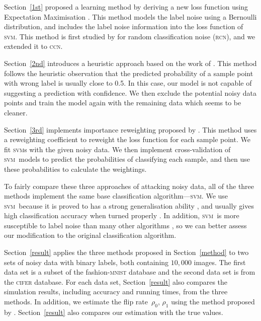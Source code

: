 \documentclass[12pt]{article} %
\newcommand{\svm}{\textsc{svm}}
\begin{document}
Section~\ref{1st} proposed a learning method by deriving a new loss function using Expectation Maximisation \citep[p.423]{Bishop:2006:PRM:1162264}. This method models the label noise using a Bernoulli distribution, and includes the label noise information into the loss function of \svm. This method is first studied by \citet{pmlr-v20-biggio11} for random classification noise (\textsc{rcn}), and we extended it to \textsc{ccn}. 

Section~\ref{2nd} introduces a heuristic approach based on the work of \citet{brodley1996identifying}. This method follows the heuristic observation that the predicted probability of a sample point with wrong label is usually close to 0.5. In this case, our model is not capable of suggesting a prediction with confidence. We then exclude the potential noisy data points and train the model again with the remaining data which seems to be cleaner. 

Section~\ref{3rd} implements importance reweighting proposed by \citet{liu2016classification}. This method uses a reweighting coefficient to reweight the loss function for each sample point. We fit \svm s with the given noisy data. We then implement cross-validation of \svm\ models to predict the probabilities of classifying each sample, and then use these probabilities to calculate the weightings.

To fairly compare these three approaches of attacking noisy data, all of the three methods implement the same base classification algorithm---\svm. We use \svm\ because it is proved to has a strong generalisation ability \citep{NIPS2012_4500,Seeger:2003:PGE:944919.944929,Cortes1995}, and usually gives high classification accuracy when turned properly \citep{Fernandez-Delgado:2014:WNH:2627435.2697065}. In addition, \svm\ is more susceptible to label noise than many other algorithms \citep{frenay2014classification}, so we can better assess our modification to the original classification algorithm.

Section~\ref{result} applies the three methods proposed in Section~\ref{method} to two sets of noisy data with binary labels, both containing $10,000$ images. The first data set is a subset of the fashion-\textsc{mnist} database and the second data set is from the \textsc{cifer} database. For each data set, Section~\ref{result} also compares the simulation results, including accuracy and running times, from the three methods. In addition, we estimate the flip rate~$\rho_0$, $\rho_1$ using the method proposed by \citet{liu2016classification}. 
Section~\ref{result} also compares our estimation with the true values.
\end{document}
